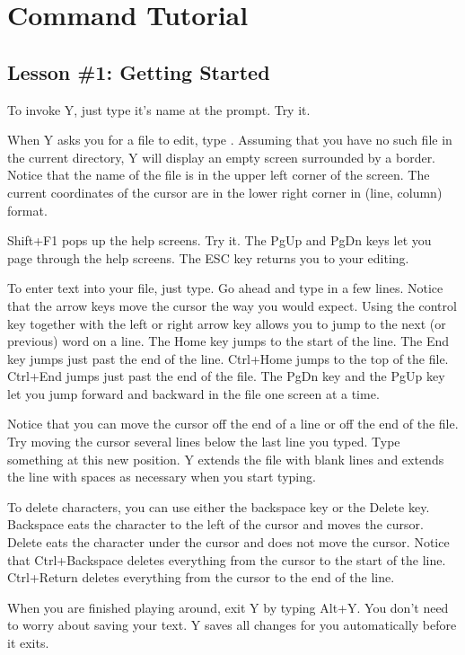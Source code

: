 \chapter{Command Tutorial}

\section{Lesson \#1: Getting Started}

To invoke Y, just type it's name at the prompt. Try it.

When Y asks you for a file to edit, type . Assuming that you have no such
file in the current directory, Y will display an empty screen surrounded by a border. Notice
that the name of the file is in the upper left corner of the screen. The current coordinates of
the cursor are in the lower right corner in (line, column) format.

Shift+F1 pops up the help screens. Try it. The PgUp and PgDn keys let you page through the help
screens. The ESC key returns you to your editing.

To enter text into your file, just type. Go ahead and type in a few lines. Notice that the arrow
keys move the cursor the way you would expect. Using the control key together with the left or
right arrow key allows you to jump to the next (or previous) word on a line. The Home key jumps
to the start of the line. The End key jumps just past the end of the line. Ctrl+Home jumps to
the top of the file. Ctrl+End jumps just past the end of the file. The PgDn key and the PgUp key
let you jump forward and backward in the file one screen at a time.

Notice that you can move the cursor off the end of a line or off the end of the file. Try moving
the cursor several lines below the last line you typed. Type something at this new position. Y
extends the file with blank lines and extends the line with spaces as necessary when you start
typing.

To delete characters, you can use either the backspace key or the Delete key. Backspace eats the
character to the left of the cursor and moves the cursor. Delete eats the character under the
cursor and does not move the cursor. Notice that Ctrl+Backspace deletes everything from the
cursor to the start of the line. Ctrl+Return deletes everything from the cursor to the end of
the line.

When you are finished playing around, exit Y by typing Alt+Y. You don't need to worry about
saving your text. Y saves all changes for you automatically before it exits.

